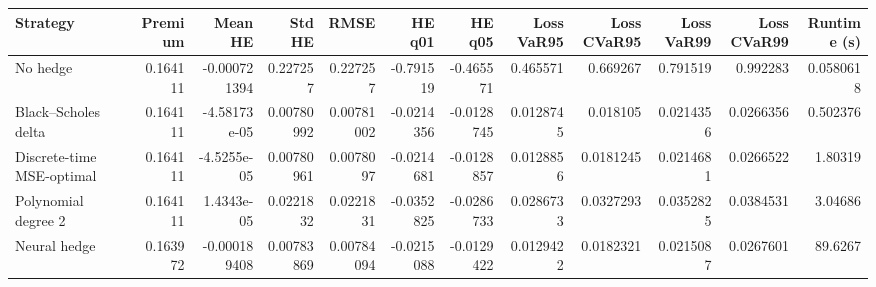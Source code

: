 \begin{tabular}{lrrrrrrrrrrr}
\toprule
Strategy & Premium & Mean HE & Std HE & RMSE & HE q01 & HE q05 & Loss VaR95 & Loss CVaR95 & Loss VaR99 & Loss CVaR99 & Runtime (s) \\
\midrule
No hedge & 0.164111 & -0.000721394 & 0.227257 & 0.227257 & -0.791519 & -0.465571 & 0.465571 & 0.669267 & 0.791519 & 0.992283 & 0.0580618 \\
Black--Scholes delta & 0.164111 & -4.58173e-05 & 0.00780992 & 0.00781002 & -0.0214356 & -0.0128745 & 0.0128745 & 0.018105 & 0.0214356 & 0.0266356 & 0.502376 \\
Discrete-time MSE-optimal & 0.164111 & -4.5255e-05 & 0.00780961 & 0.0078097 & -0.0214681 & -0.0128857 & 0.0128856 & 0.0181245 & 0.0214681 & 0.0266522 & 1.80319 \\
Polynomial degree 2 & 0.164111 & 1.4343e-05 & 0.0221832 & 0.0221831 & -0.0352825 & -0.0286733 & 0.0286733 & 0.0327293 & 0.0352825 & 0.0384531 & 3.04686 \\
Neural hedge & 0.163972 & -0.000189408 & 0.00783869 & 0.00784094 & -0.0215088 & -0.0129422 & 0.0129422 & 0.0182321 & 0.0215087 & 0.0267601 & 89.6267 \\
\bottomrule
\end{tabular}
